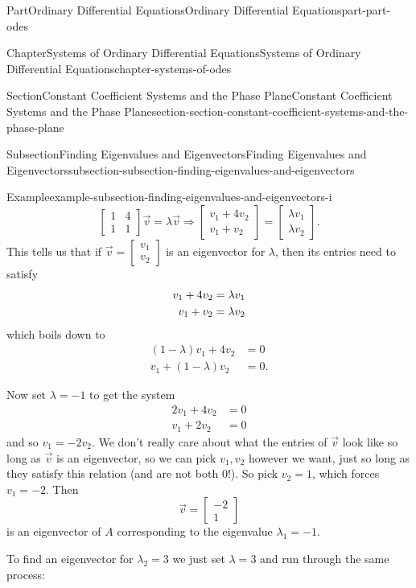 \documentclass[twoside,10pt,]{book}
\numberwithin{equation}{part}
\begin{document}
\begin{partptx}{Part}{Ordinary Differential Equations}{}{Ordinary Differential Equations}{}{}{part-part-odes}
\begin{chapterptx}{Chapter}{Systems of Ordinary Differential Equations}{}{Systems of Ordinary Differential Equations}{}{}{chapter-systems-of-odes}
\begin{sectionptx}{Section}{Constant Coefficient Systems and the Phase Plane}{}{Constant Coefficient Systems and the Phase Plane}{}{}{section-section-constant-coefficient-systems-and-the-phase-plane}
\begin{subsectionptx}{Subsection}{Finding Eigenvalues and Eigenvectors}{}{Finding Eigenvalues and Eigenvectors}{}{}{subsection-subsection-finding-eigenvalues-and-eigenvectors}
\begin{example}{Example}{}{example-subsection-finding-eigenvalues-and-eigenvectors-i}
\begin{equation*}
\begin{bmatrix}1 &  4 \\ 1 &  1\end{bmatrix}\vec{v} = \lambda\vec{v} \Rightarrow \begin{bmatrix}v_{1}+4v_{2} \\ v_{1} + v_{2}\end{bmatrix} = \begin{bmatrix} \lambda v_{1} \\ \lambda v_{2} \end{bmatrix}.
\end{equation*}
This tells us that if \(\vec{v} = \begin{bmatrix}v_{1} \\ v_{2} \end{bmatrix}\) is an eigenvector for \(\lambda\), then its entries need to satisfy%
\begin{align}
v_{1}+4v_{2}& =\lambda v_{1}\notag\\
v_{1}+v_{2} & = \lambda v_{2}\notag
\end{align}
which boils down to%
\begin{align*}
(1-\lambda)v_{1}+4v_{2} & = 0\\
v_{1} + (1-\lambda)v_{2} & = 0.
\end{align*}
%
\par
Now set \(\lambda = -1\) to get the system%
\begin{align*}
2v_{1} + 4v_{2} & = 0\\
v_{1} + 2v_{2} & = 0
\end{align*}
and so \(v_{1} = -2v_{2}\). We don't really care about what the entries of \(\vec{v}\) look like so long as \(\vec{v}\) is an eigenvector, so we can pick \(v_{1},v_{2}\) however we want, just so long as they satisfy this relation (and are not both \(0\)!). So pick \(v_{2} = 1\), which forces \(v_{1} = -2\). Then%
\begin{equation*}
\vec{v} = \begin{bmatrix}-2\\1\end{bmatrix}
\end{equation*}
is an eigenvector of \(A\) corresponding to the eigenvalue \(\lambda_{1} = -1\).%
\par
To find an eigenvector for \(\lambda_{2} = 3\) we just set \(\lambda  = 3\) and run through the same process:%
\begin{align*}

\end{align*}
\end{example}
\end{subsectionptx}
\end{sectionptx}
\end{chapterptx}
\end{partptx}
\end{document}
